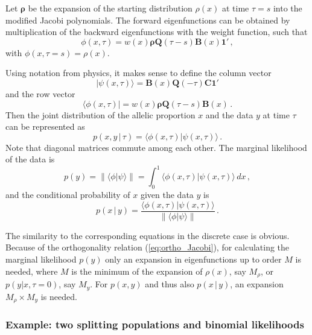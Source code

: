 \documentclass[preprint]{elsarticle}
\newcommand{\bs}[1]{\ensuremath{\boldsymbol{#1}}}
\newcommand\given{{\,|\,}}
\newcommand{\norm}[1]{\left\lVert#1\right\rVert}
\newcommand\oneC{\ensuremath{\mathbf{1}'}}
\begin{document}
Let $\bs{\rho}$ be the expansion of the starting distribution $\rho(x)$ at time $\tau=s$ into the modified Jacobi polynomials. The forward eigenfunctions can be obtained by multiplication of the backward eigenfunctions with the weight function, such that 
\begin{equation}
\phi(x,\tau)=w(x)\bs{\rho}\mathbf{Q}(\tau-s)\mathbf{B}(x)\oneC\,,
\end{equation}
with $\phi(x,\tau=s)=\rho(x)$.

Using notation from physics, it makes sense to define the column vector
\begin{equation}
|\psi(x,\tau)\rangle=\mathbf{B}(x)\mathbf{Q}(-\tau)\mathbf{C}\oneC
\end{equation}
and the row vector
\begin{equation}
\langle\phi(x,\tau)|=w(x)\bs{\rho}\mathbf{Q}(\tau-s)\mathbf{B}(x)\,.
\end{equation}
Then the joint distribution of the allelic proportion $x$ and the data $y$ at time $\tau$ can be represented as
\begin{equation}
p(x,y\given \tau)=\langle\phi(x,\tau)|\psi(x,\tau)\rangle\,.
\end{equation}
Note that diagonal matrices commute among each other. The marginal likelihood of the data is
\begin{equation}
p(y)=\norm{\langle\phi|\psi\rangle}=\int_0^1 \langle\phi(x,\tau)|\psi(x,\tau)\rangle\,dx\,,
\end{equation}
and the conditional probability of $x$ given the data $y$ is
\begin{equation}
p(x\given y)=\frac{\langle\phi(x,\tau)|\psi(x,\tau)\rangle}{\norm{\langle\phi|\psi\rangle}}\,.
\end{equation}

The similarity to the corresponding equations in the discrete case is obvious. Because of the orthogonality relation (\ref{eq:ortho_Jacobi}), for calculating the marginal likelihood $p(y)$ only an expansion in eigenfunctions up to order $M$ is needed, where $M$ is the minimum of the expansion of $\rho(x)$, say $M_\rho$, or $p(y|x,\tau=0)$, say $M_y$. For $p(x,y)$ and thus also $p(x\given y)$, an expansion $M_\rho\times M_y$ is needed.

\subsubsection{Example: two splitting populations and binomial likelihoods}
\end{document}
